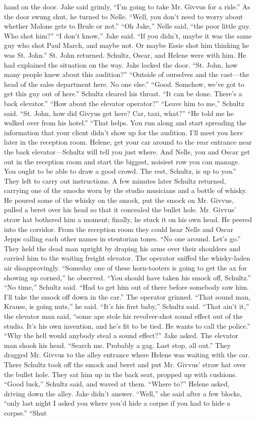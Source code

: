 \documentclass{novel}
\begin{document}
hand on the door. Jake said grimly, “I’m going to take Mr. Givvus for a ride.” As the door swung shut, he turned to Nelle. “Well, you don’t need to worry about whether Malone gets to Brule or not.” “Oh Jake,” Nelle said, “the poor little guy. Who shot him?” “I don’t know,” Jake said. “If you didn’t, maybe it was the same guy who shot Paul March, and maybe not. Or maybe Essie shot him thinking he was St. John.” St. John returned. Schultz, Oscar, and Helene were with him. He had explained the situation on the way. Jake locked the door. “St. John, how many people knew about this audition?” “Outside of ourselves and the cast—the head of the sales department here. No one else.” “Good. Somehow, we’ve got to get this guy out of here.” Schultz cleared his throat. “It can be done. There’s a back elevator.” “How about the elevator operator?” “Leave him to me,” Schultz said. “St. John, how did Givyus get here? Car, taxi, what?” “He told me he walked over from his hotel.” “That helps. You run along and start spreading the information that your client didn’t show up for the audition. I'll meet you here later in the reception room. Helene, get your car around to the rear entrance near the back elevator—Schultz will tell you just where. And Nelle, you and Oscar get out in the reception room and start the biggest, noisiest row you can manage. You ought to be able to draw a good crowd. The rest, Schultz, is up to you.” They left to carry out instructions. A few minutes later Schultz returned, carrying one of the smocks worn by the studio musicians and a bottle of whisky. He poured some of the whisky on the smock, put the smock on Mr. Givvus, pulled a beret over his head so that it concealed the bullet hole. Mr. Givvus’ straw hat bothered him a moment; finally, he stuck it on his own head. He peered into the corridor. From the reception room they could hear Nelle and Oscar Jepps calling each other names in stentorian tones. “No one around. Let’s go.” They held the dead man upright by draping his arms over their shoulders and carried him to the waiting freight elevator. The operator sniffed the whisky-laden air disapprovingly. “Someday one of these horn-tooters is going to get the ax for showing up corned,” he observed. “You should have taken his smock off, Schultz.” “No time,” Schultz said. “Had to get him out of there before somebody saw him. I’ll take the smock off down in the car.” The operator grinned. “That sound man, Krause, is going nuts,” he said. “It’s his first baby,” Schultz said. “That ain’t it,” the elevator man said, “some ape stole his revolver-shot sound effect out of the studio. It’s his own invention, and he’s fit to be tied. He wants to call the police.” “Why the hell would anybody steal a sound effect?” Jake asked. The elevator man shook his head. “Search me. Probably a gag. Last stop, all out.” They dragged Mr. Givvus to the alley entrance where Helene was waiting with the car. There Schultz took off the smock and beret and put Mr. Givvus’ straw hat over the bullet hole. They sat him up in the back seat, propped up with cushions. “Good luck,” Schultz said, and waved at them. “Where to?” Helene asked, driving down the alley. Jake didn’t answer. “Well,” she said after a few blocks, “only last night I asked you where you’d hide a corpse if you had to hide a corpse.” “Shut 
\end{document}
